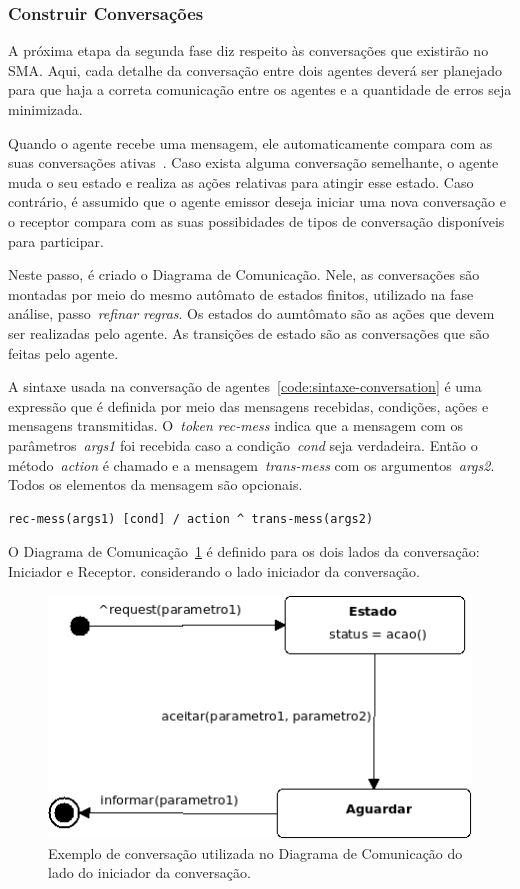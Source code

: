 \subsubsection{Construir Conversações}

A próxima etapa da segunda fase diz respeito às conversações que existirão no SMA. Aqui, cada detalhe da conversação entre dois agentes deverá ser planejado para que haja a correta comunicação entre os agentes e a quantidade de erros seja minimizada.

Quando o agente recebe uma mensagem, ele automaticamente compara com as suas conversações ativas~\cite{scott01}. Caso exista alguma conversação semelhante, o agente muda o seu estado e realiza as ações relativas para atingir esse estado. Caso contrário, é assumido que o agente emissor deseja iniciar uma nova conversação e o receptor compara com as suas possibidades de tipos de conversação disponíveis para participar.

Neste passo, é criado o Diagrama de Comunicação. Nele, as conversações são montadas por meio do mesmo autômato de estados finitos, utilizado na fase análise, passo~\emph{refinar regras}. Os estados do aumtômato são as ações que devem ser realizadas pelo agente. As transições de estado são as conversações que são feitas pelo agente.

A sintaxe usada na conversação de agentes~\ref{code:sintaxe-conversation} é uma expressão que é definida por meio das mensagens recebidas, condições, ações e mensagens transmitidas. O~\emph{token rec-mess} indica que a mensagem com os parâmetros~\emph{args1} foi recebida caso a condição~\emph{cond} seja verdadeira. Então o método~\emph{action} é chamado e a mensagem~\emph{trans-mess} com os argumentos~\emph{args2}. Todos os elementos da mensagem são opcionais.

\begin{lstlisting}[label=code:sintaxe-conversation,caption=Sintaxe da conversação entre dois agentes.]
	rec-mess(args1) [cond] / action ^ trans-mess(args2)
\end{lstlisting}

O Diagrama de Comunicação~\ref{fig:exemplo-conversation} é definido para os dois lados da conversação: Iniciador e Receptor. considerando o lado iniciador da conversação.

\begin{figure}
	\centering
	\includegraphics[scale=0.65]{images/exemplo-conversation.png}
	\caption{Exemplo de conversação utilizada no Diagrama de Comunicação do lado do iniciador da conversação.}
	\label{fig:exemplo-conversation}
\end{figure}

